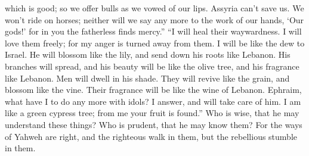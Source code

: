 which is good; so we offer bulls as we vowed of our lips. 
Assyria can't save us. We won't ride on horses; neither will we say any
more to the work of our hands, `Our gods!' for in you the fatherless
finds mercy.''  ``I will heal their waywardness. I will love
them freely; for my anger is turned away from them.  I will
be like the dew to Israel. He will blossom like the lily, and send down
his roots like Lebanon.  His branches will spread, and his
beauty will be like the olive tree, and his fragrance like Lebanon.
 Men will dwell in his shade. They will revive like the
grain, and blossom like the vine. Their fragrance will be like the wine
of Lebanon.  Ephraim, what have I to do any more with idols?
I answer, and will take care of him. I am like a green cypress tree;
from me your fruit is found.''  Who is wise, that he may
understand these things? Who is prudent, that he may know them? For the
ways of Yahweh are right, and the righteous walk in them, but the
rebellious stumble in them.
